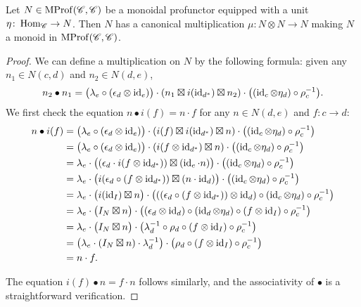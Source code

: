 \documentclass[12pt,oneside,article,draft]{memoir}
\begin{document}
\begin{proposition}
	Let $N\in\operatorname{MProf}(\mathscr{C},\mathscr{C})$ be a monoidal profunctor equipped with a unit $\eta\colon\operatorname{Hom}_{\mathscr{C}}\to N$. Then $N$ has a canonical multiplication $\mu\colon N\otimes N\to N$ making $N$ a monoid in $\operatorname{MProf}(\mathscr{C},\mathscr{C})$.
\end{proposition}
\begin{proof}
	We can define a multiplication on $N$ by the following formula: given any $n_1\in N(c,d)$ and $n_2\in N(d,e)$,
	\[
		n_2\bullet n_1 = \bigl(\lambda_e\circ(\epsilon_d\otimes\operatorname{id}_e)\bigr)\cdot(n_1\boxtimes i(\operatorname{id}_{d^*})\boxtimes n_2)\cdot\bigl((\operatorname{id}_c\otimes \eta_d)\circ\rho_c^{-1}\bigr).
	\]
	We first check the equation $n\bullet i(f)=n\cdot f$ for any $n\in N(d,e)$ and $f\colon c\to d$:
	\begin{align*}
		n\bullet i(f) &= \bigl(\lambda_e\circ(\epsilon_d\otimes\operatorname{id}_e)\bigr)\cdot(i(f)\boxtimes i(\operatorname{id}_{d^*})\boxtimes n)\cdot\bigl((\operatorname{id}_c\otimes \eta_d)\circ\rho_c^{-1}\bigr) \\
		&= \bigl(\lambda_e\circ(\epsilon_d\otimes\operatorname{id}_e)\bigr)\cdot(i(f\otimes\operatorname{id}_{d^*})\boxtimes n)\cdot\bigl((\operatorname{id}_c\otimes \eta_d)\circ\rho_c^{-1}\bigr) \\
		&= \lambda_e\cdot\bigl((\epsilon_d\cdot i(f\otimes \operatorname{id}_{d^*}))\boxtimes (\operatorname{id}_e\cdot n)\bigr)\cdot\bigl((\operatorname{id}_c\otimes \eta_d)\circ\rho_c^{-1}\bigr) \\
		&= \lambda_e\cdot\bigl(i(\epsilon_d\circ (f\otimes \operatorname{id}_{d^*}))\boxtimes (n\cdot\operatorname{id}_d)\bigr)\cdot\bigl((\operatorname{id}_c\otimes \eta_d)\circ\rho_c^{-1}\bigr) \\
		&= \lambda_e\cdot\bigl(i(\operatorname{id}_I)\boxtimes n\bigr)\cdot\bigl(((\epsilon_d\circ (f\otimes \operatorname{id}_{d^*}))\otimes\operatorname{id}_d)\circ(\operatorname{id}_c\otimes \eta_d)\circ\rho_c^{-1}\bigr) \\
		&= \lambda_e\cdot\bigl(I_N\boxtimes n\bigr)\cdot\bigl((\epsilon_d\otimes\operatorname{id}_d)\circ(\operatorname{id}_d\otimes\eta_d)\circ(f\otimes\operatorname{id}_I)\circ\rho_c^{-1}\bigr) \\
		&= \lambda_e\cdot\bigl(I_N\boxtimes n\bigr)\cdot\bigl(\lambda_d^{-1}\circ\rho_d\circ(f\otimes\operatorname{id}_I)\circ\rho_c^{-1}\bigr) \\
		&= \bigl(\lambda_e\cdot(I_N\boxtimes n)\cdot\lambda_d^{-1}\bigr)\cdot\bigl(\rho_d\circ(f\otimes\operatorname{id}_I)\circ\rho_c^{-1}\bigr) \\
		&= n\cdot f.
	\end{align*}

	The equation $i(f)\bullet n=f\cdot n$ follows similarly, and the associativity of $\bullet$ is a straightforward verification.


\end{proof}
\end{document}
